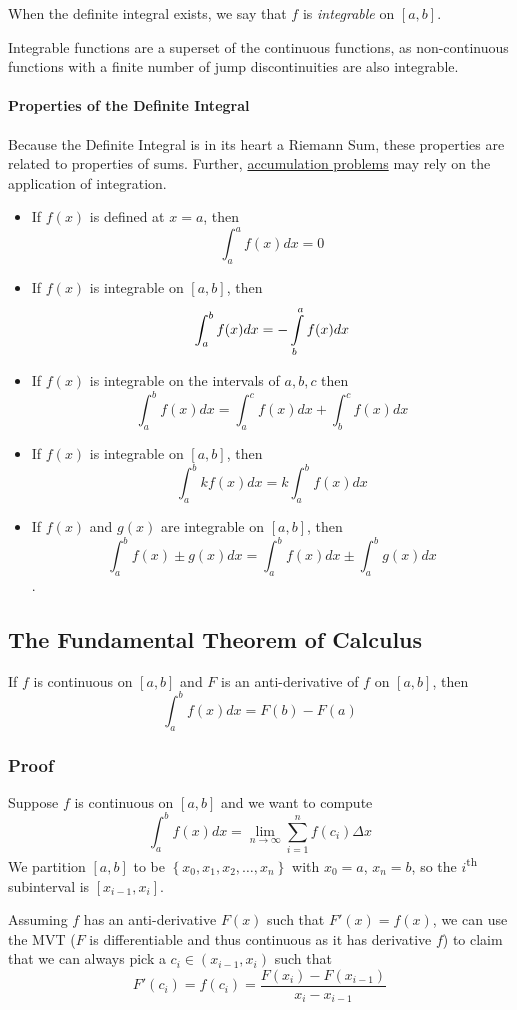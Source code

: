 \documentclass{article}
\begin{document}
When the definite integral exists, we say that $f$ is \emph{integrable} on $[a,b]$.

Integrable functions are a superset of the continuous functions, as non-continuous functions with a finite number of jump discontinuities are also integrable.

\paragraph{Properties of the Definite Integral}
Because the Definite Integral is in its heart a Riemann Sum, these properties are related to properties of sums. Further, \underline{accumulation problems} may rely on the application of integration.
\begin{itemize}
    \item If $f(x)$ is defined at $x=a$, then $$\int_a^a f(x)dx=0$$
    \item If $f(x)$ is integrable on $[a,b]$, then $$\int_a^b f(x)dx=-\int_b^a\limits f(x)dx$$
    \item If $f(x)$ is integrable on the intervals of $a, b, c$ then $$\int_a^b f(x)dx = \int_a^c f(x)dx + \int_b^c f(x)dx$$
    \item If $f(x)$ is integrable on $[a, b]$, then $$\int_a^b kf(x)dx = k\int_a^b f(x)dx$$
    \item If $f(x)$ and $g(x)$ are integrable on $[a, b]$, then $$\int_a^bf(x)\pm g(x)dx = \int_a^b f(x)dx \pm \int_a^b g(x)dx$$.
\end{itemize}

\subsection{The Fundamental Theorem of Calculus}
If $f$ is continuous on $[a,b]$ and $F$ is an anti-derivative of $f$ on $[a,b]$, then $$\int_a^bf(x)dx=F(b)-F(a)$$

\subsubsection{Proof}
Suppose $f$ is continuous on $[a,b]$ and we want to compute $$\int_a^bf(x)dx = \lim_{n\to\infty}\sum_{i=1}^nf(c_i)\Delta x$$
We partition $[a,b]$ to be $\left\{x_0,x_1,x_2,\ldots,x_n\right\}$ with $x_0=a$, $x_n=b$, so the $i$\textsuperscript{th} subinterval is $[x_{i-1},x_i]$.

Assuming $f$ has an anti-derivative $F(x)$ such that $F'(x)=f(x)$, we can use the MVT ($F$ is differentiable and thus continuous as it has derivative $f$) to claim that we can always pick a $c_i\in(x_{i-1},x_i)$ such that $$F'(c_i)=f(c_i)=\frac{F\left(x_i\right)-F\left(x_{i-1}\right)}{x_i-x_{i-1}}$$
\end{document}
